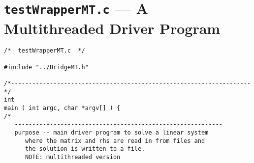 \chapter{{\tt testWrapperMT.c} --- A Multithreaded Driver Program}
\label{chapter:MT_driver}

\begin{verbatim}
/*  testWrapperMT.c  */

#include "../BridgeMT.h"

/*--------------------------------------------------------------------*/
int
main ( int argc, char *argv[] ) {
/*
   -----------------------------------------------------------
   purpose -- main driver program to solve a linear system
      where the matrix and rhs are read in from files and
      the solution is written to a file.
      NOTE: multithreaded version


\end{verbatim}
